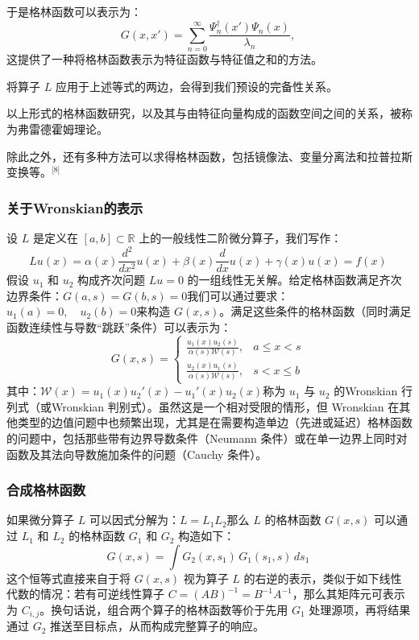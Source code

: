 于是格林函数可以表示为：
$$
G(x, x') = \sum_{n=0}^{\infty} \frac{\Psi_n^{\dagger}(x') \Psi_n(x)}{\lambda_n},~
$$
这提供了一种将格林函数表示为特征函数与特征值之和的方法。

将算子 $L$ 应用于上述等式的两边，会得到我们预设的完备性关系。

以上形式的格林函数研究，以及其与由特征向量构成的函数空间之间的关系，被称为弗雷德霍姆理论。

除此之外，还有多种方法可以求得格林函数，包括镜像法、变量分离法和拉普拉斯变换等。\(^\text{[8]}\)
\subsubsection{关于Wronskian的表示}
设 $L$ 是定义在 $[a, b] \subset \mathbb{R}$ 上的一般线性二阶微分算子，我们写作：
$$
Lu(x) = \alpha(x)\frac{d^2}{dx^2}u(x) + \beta(x)\frac{d}{dx}u(x) + \gamma(x)u(x) = f(x)~
$$
假设 $u_1$ 和 $u_2$ 构成齐次问题 $Lu = 0$ 的一组线性无关解。给定格林函数满足齐次边界条件：$G(a, s) = G(b, s) = 0$我们可以通过要求：$u_1(a) = 0,\quad u_2(b) = 0$来构造 $G(x, s)$。满足这些条件的格林函数（同时满足函数连续性与导数“跳跃”条件）可以表示为：
$$
G(x, s) =
\begin{cases}
\displaystyle \frac{u_1(x) u_2(s)}{\alpha(s)\mathcal{W}(s)}, & a \leq x < s \\
\displaystyle \frac{u_2(x) u_1(s)}{\alpha(s)\mathcal{W}(s)}, & s < x \leq b
\end{cases}~
$$
其中：$\mathcal{W}(x) = u_1(x) u_2'(x) - u_1'(x) u_2(x)$称为 $u_1$ 与 $u_2$ 的Wronskian 行列式（或Wronskian 判别式）。虽然这是一个相对受限的情形，但 Wronskian 在其他类型的边值问题中也频繁出现，尤其是在需要构造单边（先进或延迟）格林函数的问题中，包括那些带有边界导数条件（Neumann 条件）或在单一边界上同时对函数及其法向导数施加条件的问题（Cauchy 条件）。
\subsubsection{合成格林函数}
如果微分算子 $L$ 可以因式分解为：$L = L_1 L_2$那么 $L$ 的格林函数 $G(x, s)$ 可以通过 $L_1$ 和 $L_2$ 的格林函数 $G_1$ 和 $G_2$ 构造如下：
$$
G(x, s) = \int G_2(x, s_1) \, G_1(s_1, s) \, ds_1~
$$
这个恒等式直接来自于将 $G(x, s)$ 视为算子 $L$ 的右逆的表示，类似于如下线性代数的情况：若有可逆线性算子 $C = (AB)^{-1} = B^{-1} A^{-1}$，那么其矩阵元可表示为 $C_{i,j}$。换句话说，组合两个算子的格林函数等价于先用 $G_1$ 处理源项，再将结果通过 $G_2$ 推送至目标点，从而构成完整算子的响应。

